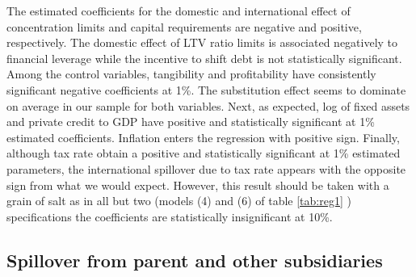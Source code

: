 \documentclass[12pt]{article}
\begin{document}
\begin{table}	
	\caption{}       
	\scalebox{0.8}{}
	\label{tab:reg1}
\end{table}
The estimated coefficients for the domestic and international effect of concentration limits and capital requirements are negative and positive, respectively. The domestic effect of LTV ratio limits is associated negatively to financial leverage while the incentive to shift debt is not statistically significant. Among the control variables, tangibility and profitability have consistently significant negative coefficients at 1\%. The substitution effect seems to dominate on average in our sample for both variables. Next, as expected, log of fixed assets and private credit to GDP have positive and statistically significant at 1\% estimated coefficients. Inflation enters the regression with positive sign. Finally, although tax rate obtain a positive and statistically significant at 1\% estimated parameters, the international spillover due to tax rate appears with the opposite sign from what we would expect. However, this result should be taken with a grain of salt as in all but two (models (4) and (6) of table \ref{tab:reg1} ) specifications the coefficients are statistically insignificant at 10\%.
\begin{table}	
	\caption{}
	\scalebox{0.8}{}
	\label{tab:reg2}
\end{table}
	\subsection{Spillover from parent and other subsidiaries} \label{subsec:split_effect}
	
\begin{table}	
	\caption{}
	\scalebox{0.7}{}
	\label{tab:reg3}
\end{table}
\begin{table}	
	\caption{}
	\scalebox{0.7}{}
	\label{tab:reg4}
\end{table}
\end{document}
